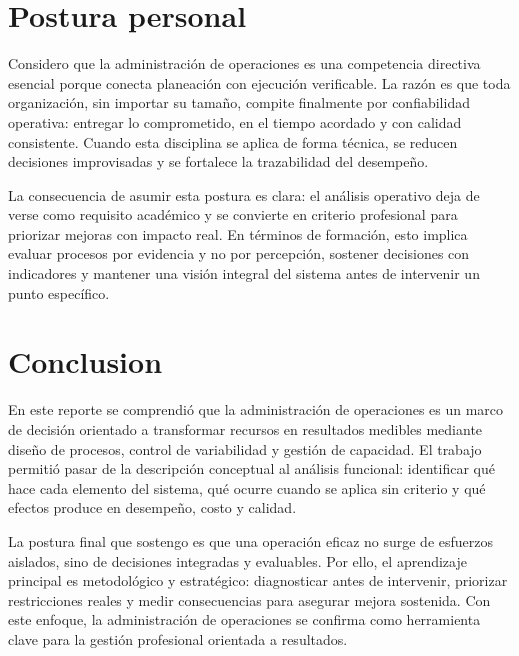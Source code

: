 \documentclass[
	spanish,
	letterpaper, oneside
]{article}
\begin{document}
\section{Postura personal}

Considero que la administración de operaciones es una competencia directiva esencial porque conecta planeación con ejecución verificable. La razón es que toda organización, sin importar su tamaño, compite finalmente por confiabilidad operativa: entregar lo comprometido, en el tiempo acordado y con calidad consistente. Cuando esta disciplina se aplica de forma técnica, se reducen decisiones improvisadas y se fortalece la trazabilidad del desempeño.

La consecuencia de asumir esta postura es clara: el análisis operativo deja de verse como requisito académico y se convierte en criterio profesional para priorizar mejoras con impacto real. En términos de formación, esto implica evaluar procesos por evidencia y no por percepción, sostener decisiones con indicadores y mantener una visión integral del sistema antes de intervenir un punto específico.

\section{Conclusion}

En este reporte se comprendió que la administración de operaciones es un marco de decisión orientado a transformar recursos en resultados medibles mediante diseño de procesos, control de variabilidad y gestión de capacidad. El trabajo permitió pasar de la descripción conceptual al análisis funcional: identificar qué hace cada elemento del sistema, qué ocurre cuando se aplica sin criterio y qué efectos produce en desempeño, costo y calidad.

La postura final que sostengo es que una operación eficaz no surge de esfuerzos aislados, sino de decisiones integradas y evaluables. Por ello, el aprendizaje principal es metodológico y estratégico: diagnosticar antes de intervenir, priorizar restricciones reales y medir consecuencias para asegurar mejora sostenida. Con este enfoque, la administración de operaciones se confirma como herramienta clave para la gestión profesional orientada a resultados.



\end{document}
